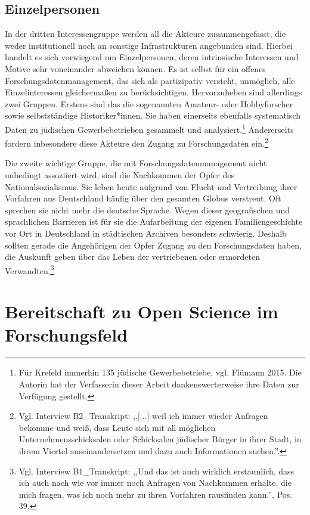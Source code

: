 \subsection{Einzelpersonen}

In der dritten Interessengruppe werden all die Akteure zusammengefasst, die weder institutionell noch an sonstige Infrastrukturen angebunden sind. Hierbei handelt es sich vorwiegend um Einzelpersonen, deren intrinsische Interessen und Motive sehr voneinander abweichen können. Es ist selbst für ein offenes Forschungsdatenmanagement, das sich als partizipativ versteht, unmöglich, alle Einzelinteressen gleichermaßen zu berücksichtigen. Hervorzuheben sind allerdings zwei Gruppen. Erstens sind das die sogenannten Amateur- oder Hobbyforscher sowie selbstständige Historiker*innen. Sie haben einerseits ebenfalls systematisch Daten zu jüdischen Gewerbebetrieben gesammelt und analysiert.\footnote{Für Krefeld immerhin 135 jüdische Gewerbebetriebe, vgl. Flümann 2015. Die Autorin hat der Verfasserin dieser Arbeit dankenswerterweise ihre Daten zur Verfügung gestellt.} Andererseits fordern inbesondere diese Akteure den Zugang zu Forschungsdaten ein.\footnote{Vgl. Interview B2\_Transkript: ,,[...] weil ich immer wieder Anfragen bekomme und weiß, dass Leute sich mit all möglichen Unternehmensschicksalen oder Schicksalen jüdischer Bürger in ihrer Stadt, in ihrem Viertel auseinandersetzen und dazu auch Informationen suchen.''.}

Die zweite wichtige Gruppe, die mit Forschungsdatenmanagement nicht unbedingt assoziiert wird, sind die Nachkommen der Opfer des Nationalsozialismus. Sie leben heute aufgrund von Flucht und Vertreibung ihrer Vorfahren aus Deutschland häufig über den gesamten Globus verstreut. Oft sprechen sie nicht mehr die deutsche Sprache. Wegen dieser geografischen und sprachlichen Barrieren ist für sie die Aufarbeitung der eigenen Familiengeschichte vor Ort in Deutschland in städtischen Archiven besonders schwierig. Deshalb sollten gerade die Angehörigen der Opfer Zugang zu den Forschungsdaten haben, die Auskunft geben über das Leben der vertriebenen oder ermordeten Verwandten.\footnote{Vgl. Interview B1\_Transkript: ,,Und das ist auch wirklich erstaunlich, dass ich auch nach wie vor immer noch Anfragen von Nachkommen erhalte, die mich fragen, was ich noch mehr zu ihren Vorfahren rausfinden kann.'', Pos. 39.}

\section{Bereitschaft zu Open Science im Forschungsfeld}

